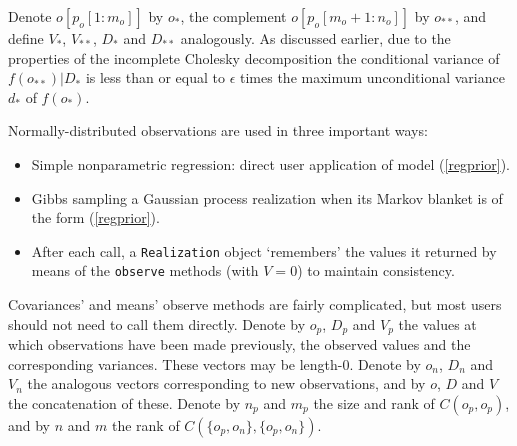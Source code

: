 \documentclass{report}
\begin{document}
Denote $o[p_o[1:m_o]]$ by $o_*$, the complement $o[p_o[m_o+1:n_o]]$ by $o_{**}$, and define $V_*$, $V_{**}$, $D_*$ and $D_{**}$ analogously. As discussed earlier, due to the properties of the incomplete Cholesky decomposition the conditional variance of $f(o_{**})|D_*$ is less than or equal to $\epsilon$ times the maximum unconditional variance $d_*$ of $f(o_*)$.

\bigskip
Normally-distributed observations are used in three important ways:
\begin{itemize}
    \item Simple nonparametric regression: direct user application of model (\ref{regprior}).
    \item Gibbs sampling a Gaussian process realization when its Markov blanket \cite{jensen}  is of the form (\ref{regprior}).
    \item After each call, a \texttt{Realization} object `remembers' the values it returned by means of the \texttt{observe} methods (with $V=0$) to maintain consistency.
\end{itemize}

Covariances' and means' observe methods are fairly complicated, but most users should not need to call them directly. Denote by $o_p$, $D_p$ and $V_p$ the values at which observations have been made previously, the observed values and the corresponding variances. These vectors may be length-0. Denote by $o_n$, $D_n$ and $V_n$ the analogous vectors corresponding to new observations, and by $o$, $D$ and $V$ the concatenation of these. Denote by $n_p$ and $m_p$ the size and rank of $C(o_p,o_p)$, and by $n$ and $m$ the rank of $C(\{o_p,o_n\},\{o_p,o_n\})$. 
\end{document}
